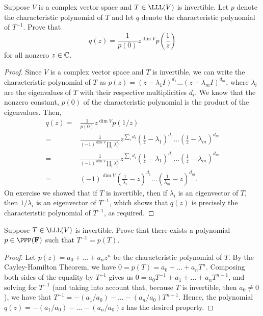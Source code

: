 \begin{exercise}{10}
  Suppose $V$ is a complex vector space and $T\in\LLL(V)$ is invertible. Let $p$ denote the characteristic polynomial of $T$ and let $q$ denote the characteristic polynomial of $T^{-1}$. Prove that 
  \[
  q(z)=\frac{1}{p(0)}z^{\dim V}p\left(\frac{1}{z}\right)
  \]
  for all nonzero $z\in\mathbb{C}$.
\end{exercise}
\begin{proof}
Since $V$ is a complex vector space and $T$ is invertible, we can write the characteristic polynomial of $T$ as $p(z)=(z-\lambda_1 I)^{d_1}\dots(z-\lambda_m I)^{d_m}$, where $\lambda_i$ are the eigenvalues of $T$ with their respective multiplicities $d_i$. We know that the nonzero constant, $p(0)$ of the characteristic polynomial is the product of the eigenvalues. Then, 
\begin{align*}
    q(z) =& \frac{1}{p(0)} z^{\dim V} p(1/z)\\
    =& \frac{1}{(-1)^{\dim V}\prod_i \lambda_i^{d_i}}z^{\sum_i d_i}\left(\frac{1}{z}-\lambda_1 \right)^{d_1}\dots\left(\frac{1}{z}-\lambda_m \right)^{d_m}\\
    =& \frac{1}{(-1)^{\dim V}\prod_i \lambda_i^{d_i}}z^{\sum_i d_i}\left(\frac{1}{z}-\lambda_1 \right)^{d_1}\dots\left(\frac{1}{z}-\lambda_m \right)^{d_m}\\
    =& (-1)^{\dim V}\left(\frac{1}{\lambda_1} - z\right)^{d_1}\dots\left(\frac{1}{\lambda_m} - z\right)^{d_m}.
\end{align*} 
 On exercise we showed that if $T$ is invertible, then if $\lambda_i$ is an eigenvector of $T$, then $1/\lambda_i$ is an eigenvector of $T^{-1}$, which shows that $q(z)$ is precisely the characteristic polynomial of $T^{-1}$, as required.
\end{proof}

\begin{exercise}{11}
  Suppose $T\in\LLL(V)$ is invertible. Prove that there exists a polynomial $p\in\PPP(\bF)$ such that $T^{-1}=p(T)$.
\end{exercise}
\begin{proof}
 Let $p(z)=a_0+\dots+a_nz^n$ be the characteristic polynomial of $T$. By the Cayley-Hamilton Theorem, we have $0 =p(T) =a_0+\dots+a_nT^n$. Composing both sides of the equality by $T^{-1}$ gives us $0 =a_0T^{-1}+a_1+\dots+a_nT^{n-1}$, and solving for $T^{-1}$ (and taking into account that, because $T$ is invertible, then $a_0\neq 0$), we have that $T^{-1} =-(a_1/a_0)-\dots-(a_n/a_0) T^{n-1}$. Hence, the polynomial $q(z) =-(a_1/a_0)-\dots-(a_n/a_0) z$ has the desired property.
\end{proof}

